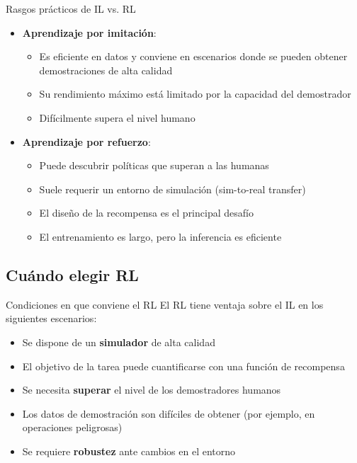 \documentclass[a4paper]{article}
\begin{document}
\begin{importantbox}{Rasgos prácticos de IL vs. RL}
\begin{itemize}
    \item \textbf{Aprendizaje por imitación}:
    \begin{itemize}
        \item Es eficiente en datos y conviene en escenarios donde se pueden obtener demostraciones de alta calidad
        \item Su rendimiento máximo está limitado por la capacidad del demostrador
        \item Difícilmente supera el nivel humano
    \end{itemize}
    \item \textbf{Aprendizaje por refuerzo}:
    \begin{itemize}
        \item Puede descubrir políticas que superan a las humanas
        \item Suele requerir un entorno de simulación (sim-to-real transfer)
        \item El diseño de la recompensa es el principal desafío
        \item El entrenamiento es largo, pero la inferencia es eficiente
    \end{itemize}
\end{itemize}
\end{importantbox}

\subsection{Cuándo elegir RL}

\begin{knowledgebox}{Condiciones en que conviene el RL}
El RL tiene ventaja sobre el IL en los siguientes escenarios:
\begin{itemize}
    \item Se dispone de un \textbf{simulador} de alta calidad
    \item El objetivo de la tarea puede cuantificarse con una función de recompensa
    \item Se necesita \textbf{superar} el nivel de los demostradores humanos
    \item Los datos de demostración son difíciles de obtener (por ejemplo, en operaciones peligrosas)
    \item Se requiere \textbf{robustez} ante cambios en el entorno
\end{itemize}
\end{knowledgebox}
\end{document}
